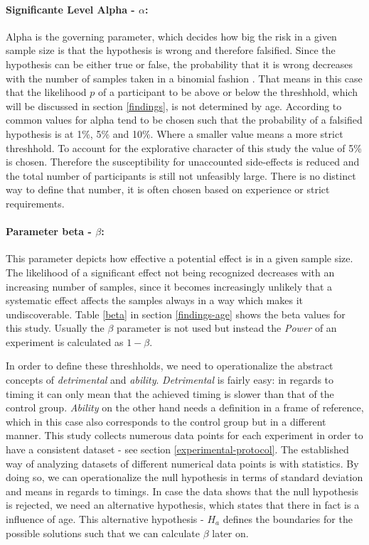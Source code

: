             \paragraph{Significante Level Alpha - $\alpha$:} Alpha is the governing parameter, which decides how big the risk in a given sample size is that the hypothesis is wrong and therefore falsified. Since the hypothesis can be either true or false, the probability that it is wrong decreases with the number of samples taken in a binomial fashion \cite[103]{Siebertz.2017}. That means in this case that the likelihood $p$ of a participant to be above or below the threshhold, which will be discussed in section \ref*{findings}, is not determined by age. According to \cite[110]{Siebertz.2017} common values for alpha tend to be chosen such that the probability of a falsified hypothesis is at 1\%, 5\% and 10\%. Where a smaller value means a more strict threshhold. To account for the explorative character of this study the value of 5\% is chosen. Therefore the susceptibility for unaccounted side-effects is reduced and the total number of participants is still not unfeasibly large. There is no distinct way to define that number, it is often chosen based on experience or strict requirements.
            
            \paragraph{Parameter beta - $\beta$:} This parameter depicts how effective a potential effect is in a given sample size. The likelihood of a significant effect not being recognized decreases with an increasing number of samples, since it becomes increasingly unlikely that a systematic effect affects the samples always in a way which makes it undiscoverable. Table \ref*{beta} in section \ref*{findings-age} shows the beta values for this study. Usually the $\beta$ parameter is not used but instead the \textit{Power} of an experiment is calculated as $1-\beta$.

            \medskip

            In order to define these threshholds, we need to operationalize the abstract concepts of \textit{detrimental} and \textit{ability}. \textit{Detrimental} is fairly easy: in regards to timing it can only mean that the achieved timing is slower than that of the control group. \textit{Ability} on the other hand needs a definition in a frame of reference, which in this case also corresponds to the control group but in a different manner. This study collects numerous data points for each experiment in order to have a consistent dataset - see section \ref{experimental-protocol}. The established way of analyzing datasets of different numerical data points is with statistics. By doing so, we can operationalize the null hypothesis in terms of standard deviation and means in regards to timings. In case the data shows that the null hypothesis is rejected, we need an alternative hypothesis, which states that there in fact is a influence of age. This alternative hypothesis - $H_{a}$ defines the boundaries for the possible solutions such that we can calculate $\beta$ later on.

